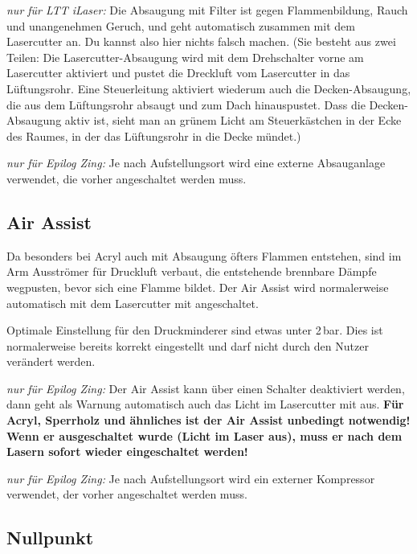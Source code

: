 \documentclass{\basedir/fablab-document}
\newcommand{\knopf}[2]{
	\begin{tikzpicture}[baseline={(box.base)}]
	\node [#1] (box) {
		\fontsize{9pt}{9pt}\selectfont \textbf{#2}\strut
	};
	\end{tikzpicture}
}
\newcommand{\nurZing}{\emph{nur für Epilog Zing:} }
\newcommand{\nurLTT}{\emph{nur für LTT iLaser:} }
\newcommand{\lueftungKnopf}[1]{\knopf{lueftungsknopf}{#1}}
\newcommand{\reflectboxX}[1]{\raisebox{\depth}{\scalebox{1}[-1]{#1}}} %
\newcommand{\returnSymbol}{\reflectboxX{\ensuremath{\mathbf{\Lsh}}}} %
\newcommand{\lueftungEnter}{\lueftungKnopf{\returnSymbol}}
\newcommand{\lueftungMinus}{\lueftungKnopf{-}}
\newcommand{\lueftungPlus}{\lueftungKnopf{+}}
\newcommand{\lueftungOn}{\lueftungKnopf{On}}
\newcommand{\lueftungOff}{\lueftungKnopf{Off}}
\begin{document}
	\nurLTT Die Absaugung mit Filter ist gegen Flammenbildung, Rauch und unangenehmen Geruch, und geht automatisch zusammen mit dem Lasercutter an. Du kannst also hier nichts falsch machen. (Sie besteht aus zwei Teilen: Die Lasercutter-Absaugung wird mit dem Drehschalter vorne am Lasercutter aktiviert und pustet die Dreckluft vom Lasercutter in das Lüftungsrohr. Eine Steuerleitung aktiviert wiederum auch die Decken-Absaugung, die aus dem Lüftungsrohr absaugt und zum Dach hinauspustet. Dass die Decken-Absaugung aktiv ist, sieht man an grünem Licht am Steuerkästchen in der Ecke des Raumes, in der das Lüftungsrohr in die Decke mündet.)

	\nurZing Je nach Aufstellungsort wird eine externe Absauganlage verwendet, die vorher angeschaltet werden muss.


	\subsection{Air Assist}
	\label{sec:air-assist}
	Da besonders bei Acryl auch mit Absaugung öfters Flammen entstehen, sind im Arm Ausströmer für Druckluft verbaut, die entstehende brennbare Dämpfe wegpusten, bevor sich eine Flamme bildet. Der Air Assist wird normalerweise automatisch mit dem Lasercutter mit angeschaltet.

	Optimale Einstellung für den Druckminderer sind etwas unter 2\,bar. Dies ist normalerweise bereits korrekt eingestellt und darf nicht durch den Nutzer verändert werden.

	\nurZing Der Air Assist kann über einen Schalter deaktiviert werden, dann geht als Warnung automatisch auch das Licht im Lasercutter mit aus. \textbf{Für Acryl, Sperrholz und ähnliches ist der Air Assist unbedingt notwendig! Wenn er ausgeschaltet wurde (Licht im Laser aus), muss er nach dem Lasern sofort wieder eingeschaltet werden!}

	\nurZing Je nach Aufstellungsort wird ein externer Kompressor verwendet, der vorher angeschaltet werden muss.

	\subsection{Nullpunkt} \label{nullpunkt}
\end{document}
